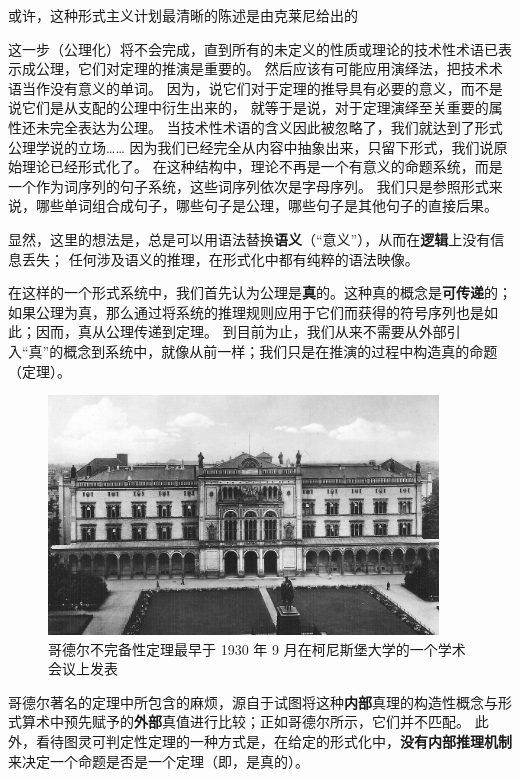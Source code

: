 \documentclass[a4paper,12pt]{article}
\begin{document}
或许，这种形式主义计划最清晰的陈述是由克莱尼给出的\cite{KleeneSC1952}

\begin{displayquote}
这一步（\gls{公理化}）将不会完成，直到所有的未定义的性质或理论的技术性术语已表示成\gls{公理}，它们对\gls{定理}的推演是重要的。
然后应该有可能应用演绎法，把技术术语当作没有意义的单词。
因为，说它们对于定理的推导具有必要的意义，而不是说它们是从支配的公理中衍生出来的，
就等于是说，对于定理演绎至关重要的属性还未完全表达为公理。
当技术性术语的含义因此被忽略了，我们就达到了形式公理学说的立场……
因为我们已经完全从内容中抽象出来，只留下形式，我们说原始理论已经形式化了。
在这种结构中，理论不再是一个有意义的命题系统，而是一个作为词序列的句子系统，这些词序列依次是字母序列。
我们只是参照\gls{形式}来说，哪些单词组合成句子，哪些句子是\gls{公理}，哪些句子是其他句子的直接后果。
\end{displayquote}

显然，这里的想法是，总是可以用语法替换\textbf{语义}（“意义”），从而在\textbf{逻辑}上没有信息丢失；
任何涉及语义的推理，在形式化中都有纯粹的语法映像。

在这样的一个形式系统中，我们首先认为公理是\textbf{真}的。这种真的概念是\textbf{可传递}的；
如果公理为真，那么通过将系统的\gls{推理规则}应用于它们而获得的符号序列也是如此；因而，真从公理传递到定理。
到目前为止，我们从来不需要从外部引入“真”的概念到系统中，就像从前一样；我们只是在推演的过程中构造真的命题（定理）。

\begin{figure}[ht]
\centering
\includegraphics[height=2.5in]{images/konigsberger_university.jpg}
\caption{哥德尔不完备性定理最早于 1930 年 9 月在柯尼斯堡大学的一个学术会议上发表}
\end{figure}

哥德尔著名的定理\cite{GodelK1931}中所包含的麻烦，源自于试图将这种\textbf{内部}真理的构造性概念与\gls{形式算术}中预先赋予的\textbf{外部}真值进行比较；正如哥德尔所示，它们并不匹配。
此外，看待图灵可判定性定理\cite{TuringA1937}的一种方式是，在给定的形式化中，\textbf{没有内部推理机制}来决定一个命题是否是一个定理（即，是真的）。
\end{document}
